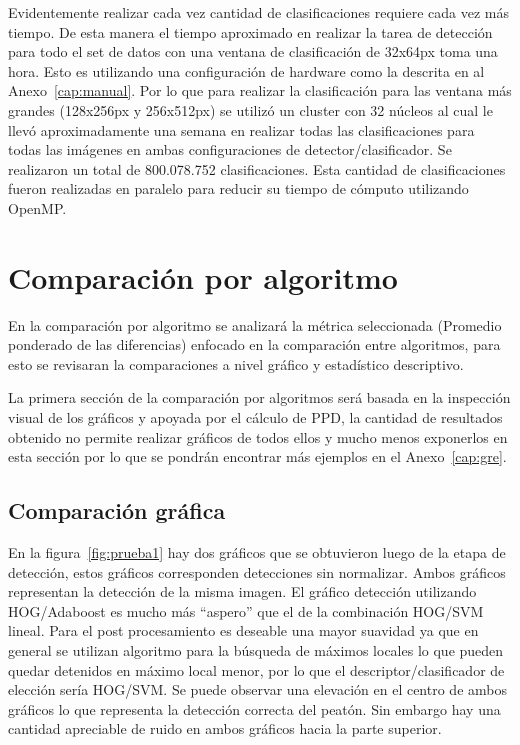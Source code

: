 Evidentemente realizar cada vez cantidad de clasificaciones requiere cada vez más tiempo. De esta manera el tiempo aproximado en realizar la tarea de detección para todo el set de datos con una ventana de clasificación de 32x64px toma una hora. Esto es utilizando una configuración de hardware como la descrita en al Anexo~\ref{cap:manual}. Por lo que para realizar la clasificación para las ventana más grandes (128x256px y 256x512px) se utilizó un cluster con 32 núcleos al cual le llevó aproximadamente una semana en realizar todas las clasificaciones para todas las imágenes en ambas configuraciones de detector/clasificador. Se realizaron un total de 800.078.752 clasificaciones. Esta cantidad de clasificaciones fueron realizadas en paralelo para reducir su tiempo de cómputo utilizando OpenMP.

 
\section{Comparación por algoritmo}
\label{analisis:compalgoritmo}

En la comparación por algoritmo se analizará la métrica seleccionada (Promedio ponderado de las diferencias) enfocado en la comparación entre algoritmos, para esto se revisaran la comparaciones a nivel gráfico y estadístico descriptivo.%

La primera sección de la comparación por algoritmos será basada en la inspección visual de los gráficos y apoyada por el cálculo de PPD, la cantidad de resultados obtenido no permite realizar gráficos de todos ellos y mucho menos exponerlos en esta sección por lo que se pondrán encontrar más ejemplos en el Anexo~\ref{cap:gre}. 

\subsection{Comparación gráfica}

En la figura~\ref{fig:prueba1} hay dos gráficos que se obtuvieron luego de la etapa de detección, estos gráficos corresponden detecciones sin normalizar. Ambos gráficos representan la detección de la misma imagen. El gráfico detección utilizando HOG/Adaboost es mucho más ``aspero'' que el de la combinación HOG/SVM lineal. Para el post procesamiento es deseable una mayor suavidad ya que en general se utilizan algoritmo para la búsqueda de máximos locales lo que pueden quedar detenidos en máximo local menor, por lo que el descriptor/clasificador de elección sería HOG/SVM. Se puede observar una elevación en el centro de ambos gráficos lo que representa la detección correcta del peatón. Sin embargo hay una cantidad apreciable de ruido en ambos gráficos hacia la parte superior. 

